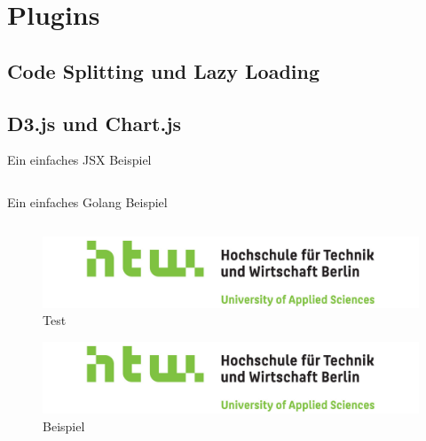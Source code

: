 \section{Plugins}
\subsection{Code Splitting und Lazy Loading}
\subsection{D3.js und Chart.js}
\begin{listing}
    \label{lst:HelloJSX}
    \caption{Ein einfaches JSX Beispiel}
    \inputminted{jsx}{snippets/examples/Welcome.jsx}
\end{listing}

\begin{listing}
    \label{lst:Golang}
    \caption{Ein einfaches Golang Beispiel}
    \inputminted{go}{snippets/examples/hello.go}
\end{listing}

\newpage

\begin{figure}
    \label{figure:test}
    \includegraphics[scale=0.2]{img/HTW}
    \caption{Test}
\end{figure}

\begin{figure}
    \label{figure:beispiel}
    \includegraphics[scale=0.2]{img/HTW}
    \caption{Beispiel}
\end{figure}
